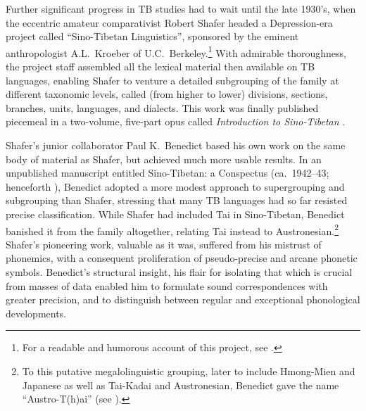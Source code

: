 Further significant progress in TB studies had to wait until the late 1930’s, when the eccentric amateur comparativist Robert Shafer headed a Depression-era project called “Sino-Tibetan Linguistics”, sponsored by the eminent anthropologist A.L.\ Kroeber of U.C.\ Berkeley.\footnote{For a readable and humorous account of this project, see \citealt{PKB-WIAB}.} With admirable thoroughness, the project staff assembled all the lexical material then available on TB languages, enabling Shafer to venture a detailed subgrouping of the family at different taxonomic levels, called (from higher to lower) divisions, sections, branches, units, languages, and dialects. This work was finally published piecemeal in a two-volume, five-part opus called \textit{Introduction to Sino-Tibetan} \citeyearpar{SHA1966-73}.

Shafer’s junior collaborator Paul K.\ Benedict based his own work on the same body of material as Shafer, but achieved much more usable results. In an unpublished manuscript entitled Sino-Tibetan: a Conspectus (ca.\ 1942–43; henceforth \textit{}), Benedict adopted a more modest approach to supergrouping and subgrouping than Shafer, stressing that many TB languages had so far resisted precise classification. While Shafer had included Tai in Sino-Tibetan, Benedict \citeyearpar{PKB-TKI} banished it from the family altogether, relating Tai instead to Austronesian.\footnote{To this putative megalolinguistic grouping, later to include Hmong-Mien and Japanese as well as Tai-Kadai and Austronesian, Benedict gave the name “Austro-T(h)ai” (see \citealt{PKB-ATLC,PKB-ATJ}).} Shafer’s pioneering work, valuable as it was, suffered from his mistrust of phonemics, with a consequent proliferation of pseudo-precise and arcane phonetic symbols. Benedict’s structural insight, his flair for isolating that which is crucial from masses of data  enabled him to formulate sound correspondences with greater precision, and to distinguish between regular and exceptional phonological developments.


